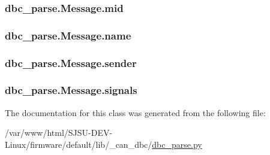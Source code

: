\subsubsection[{\texorpdfstring{mid}{mid}}]{\setlength{\rightskip}{0pt plus 5cm}dbc\+\_\+parse.\+Message.\+mid}\hypertarget{classdbc__parse_1_1Message_a1471af7a123cef3cdea575dccbaaa8ec}{}\label{classdbc__parse_1_1Message_a1471af7a123cef3cdea575dccbaaa8ec}
\subsubsection[{\texorpdfstring{name}{name}}]{\setlength{\rightskip}{0pt plus 5cm}dbc\+\_\+parse.\+Message.\+name}\hypertarget{classdbc__parse_1_1Message_a740b3f2db8f50f6254f2dfbb75f39148}{}\label{classdbc__parse_1_1Message_a740b3f2db8f50f6254f2dfbb75f39148}
\subsubsection[{\texorpdfstring{sender}{sender}}]{\setlength{\rightskip}{0pt plus 5cm}dbc\+\_\+parse.\+Message.\+sender}\hypertarget{classdbc__parse_1_1Message_a3d03a385559ab7062fc87b17b6b9becb}{}\label{classdbc__parse_1_1Message_a3d03a385559ab7062fc87b17b6b9becb}
\subsubsection[{\texorpdfstring{signals}{signals}}]{\setlength{\rightskip}{0pt plus 5cm}dbc\+\_\+parse.\+Message.\+signals}\hypertarget{classdbc__parse_1_1Message_a17107ae20dc6a96313223c258f00d3a1}{}\label{classdbc__parse_1_1Message_a17107ae20dc6a96313223c258f00d3a1}


The documentation for this class was generated from the following file\+:\begin{DoxyCompactItemize}
\item 
/var/www/html/\+S\+J\+S\+U-\/\+D\+E\+V-\/\+Linux/firmware/default/lib/\+\_\+can\+\_\+dbc/\hyperlink{dbc__parse_8py}{dbc\+\_\+parse.\+py}\end{DoxyCompactItemize}
